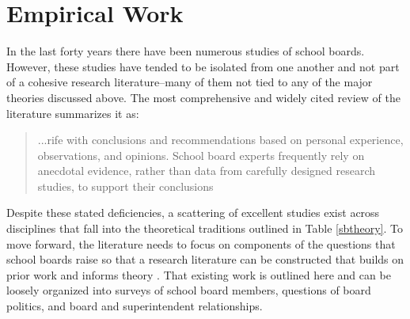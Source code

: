 \section{Empirical Work}
In the last forty years there have been numerous studies of school boards. However, these studies have tended to be isolated from one another and not part of a cohesive research literature--many of them not tied to any of the major theories discussed above. The most comprehensive and widely cited review of the literature summarizes it as:
\begin{quote}
\begin{singlespace}
...rife with conclusions and recommendations based on personal experience, observations, and opinions. School board experts frequently rely on anecdotal evidence, rather than data from carefully designed research studies, to support their conclusions \citep[ p.265]{RefWorks:312}
\end{singlespace}
\end{quote}
\vspace{-6pt}

Despite these stated deficiencies, a scattering of excellent studies exist across disciplines that fall into the theoretical traditions outlined in Table \ref{sbtheory}. To move forward, the literature needs to focus on components of the questions that school boards raise so that a research literature can be constructed that builds on prior work and informs theory \citep{RefWorks:191}. That existing work is outlined here and can be loosely organized into surveys of school board members, questions of board politics, and board and superintendent relationships.

